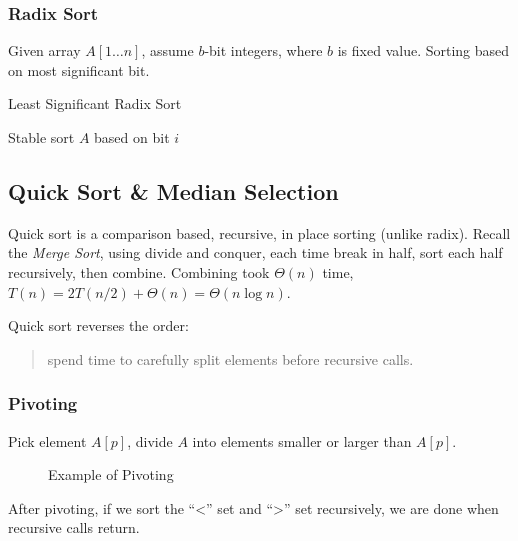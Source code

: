 \subsubsection{Radix Sort}
Given array $A[1 \ldots n]$, assume $b$-bit integers, where $b$ is fixed value.
Sorting based on most significant bit.

\begin{algorithm}[H]
    \caption{Least Significant Radix Sort}\label{algo:lrs}
    \begin{algorithmic}[1]
                \State Stable sort $A$ based on bit $i$
            \EndFor
        \EndProcedure
    \end{algorithmic}
\end{algorithm}

\subsection{Quick Sort \& Median Selection}
Quick sort is a comparison based, recursive, in place sorting (unlike radix).
Recall the \emph{Merge Sort}, using divide and conquer,
each time break in half, sort each half recursively, then combine.
Combining took $\Theta(n)$ time, $T(n) = 2T(n/2) + \Theta(n) = \Theta(n \log n)$.

Quick sort reverses the order:
\begin{quote}
    spend time to carefully split elements before recursive calls.
\end{quote}

\subsubsection{Pivoting}
Pick element $A[p]$, divide $A$ into elements smaller or larger than $A[p]$.

\begin{figure}[H]
    \caption{Example of Pivoting}\label{fig:examplepivot}
\end{figure}

After pivoting, if we sort the ``<'' set and ``>'' set recursively,
we are done when recursive calls return.


